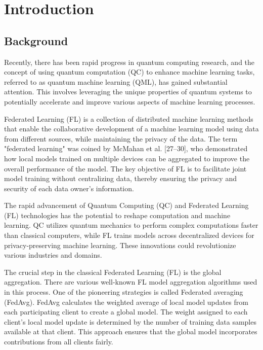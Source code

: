 \section{Introduction}\label{sec-intro}

\subsection{Background}

Recently, there has been rapid progress in quantum computing research, and the concept of using quantum computation (QC) to enhance machine learning tasks, referred to as quantum machine learning (QML), has gained substantial attention. This involves leveraging the unique properties of quantum systems to potentially accelerate and improve various aspects of machine learning processes.

Federated Learning (FL) is a collection of distributed machine learning methods that enable the collaborative development of a machine learning model using data from different sources, while maintaining the privacy of the data. The term "federated learning" was coined by McMahan et al. [27–30], who demonstrated how local models trained on multiple devices can be aggregated to improve the overall performance of the model. The key objective of FL is to facilitate joint model training without centralizing data, thereby ensuring the privacy and security of each data owner's information.

The rapid advancement of Quantum Computing (QC) and Federated Learning (FL) technologies has the potential to reshape computation and machine learning. QC utilizes quantum mechanics to perform complex computations faster than classical computers, while FL trains models across decentralized devices for privacy-preserving machine learning. These innovations could revolutionize various industries and domains.




The crucial step in the classical Federated Learning (FL) is the global aggregation. There are various well-known FL model aggregation algorithms used in this process. One of the pioneering strategies is called Federated averaging (FedAvg). FedAvg calculates the weighted average of local model updates from each participating client to create a global model. The weight assigned to each client's local model update is determined by the number of training data samples available at that client. This approach ensures that the global model incorporates contributions from all clients fairly.

